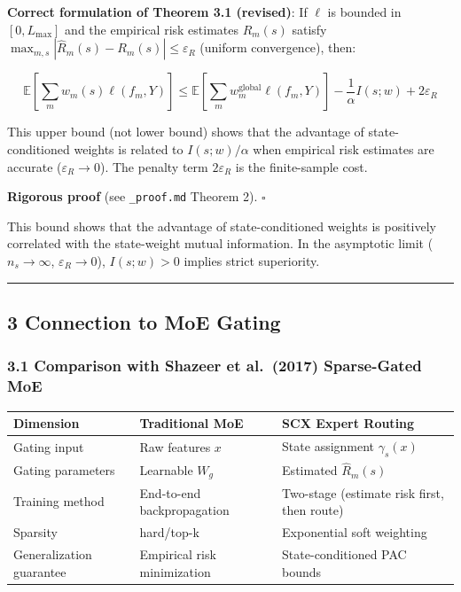 \documentclass[
  12pt,
]{article}
\begin{document}
\textbf{Correct formulation of Theorem 3.1 (revised)}: If \(\ell\) is bounded in \([0, L_{\max}]\)
and the empirical risk estimates \(\hat{R}_m(s)\) satisfy
\(\max_{m,s} |\hat{R}_m(s) - R_m(s)| \leq \varepsilon_R\) (uniform convergence), then:

\[\mathbb{E}\!\left[\sum_m w_m(s) \ell(f_m, Y)\right] \leq \mathbb{E}\!\left[\sum_m w_m^{\text{global}} \ell(f_m, Y)\right] - \frac{1}{\alpha} I(s; w) + 2\varepsilon_R\]

This upper bound (not lower bound) shows that the advantage of state-conditioned weights is related to
\(I(s;w)/\alpha\) when empirical risk estimates are accurate (\(\varepsilon_R \to 0\)).
The penalty term \(2\varepsilon_R\) is the finite-sample cost.

\textbf{Rigorous proof} (see \texttt{\_proof.md} Theorem 2). \(\square\)

This bound shows that the advantage of state-conditioned weights is positively correlated with the state-weight mutual information. In the asymptotic limit (\(n_s \to \infty\),
\(\varepsilon_R \to 0\)), \(I(s; w) > 0\) implies strict superiority.

\begin{center}\rule{0.5\linewidth}{0.5pt}\end{center}

\subsection{3 Connection to MoE Gating}\label{connection-to-moe-gating}

\subsubsection{3.1 Comparison with Shazeer et al.~(2017) Sparse-Gated MoE}\label{comparison-moe}

\begin{longtable}[]{@{}lll@{}}
\toprule\noalign{}
Dimension & Traditional MoE & SCX Expert Routing \\
\midrule\noalign{}
\endhead
\bottomrule\noalign{}
\endlastfoot
Gating input & Raw features \(x\) & State assignment \(\gamma_s(x)\) \\
Gating parameters & Learnable \(W_g\) & Estimated \(\hat{R}_m(s)\) \\
Training method & End-to-end backpropagation & Two-stage (estimate risk first, then route) \\
Sparsity & hard/top-k & Exponential soft weighting \\
Generalization guarantee & Empirical risk minimization & State-conditioned PAC bounds \\
\end{longtable}
\end{document}
